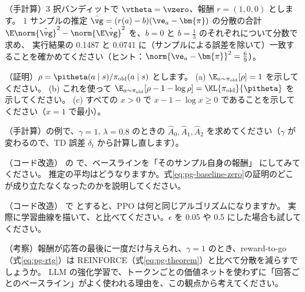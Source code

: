 \begin{exercises}
\item\label{ex:pg-bandit-var} （手計算）3 択バンディットで $\vtheta=\vzero$、報酬 $r=(1,0,0)$ とします。
1 サンプルの推定 $\hat{\vg}=(r(a)-b)(\ve_a-\bm{\pi})$ の分散の合計 $\E\norm{\hat{\vg}}^2-\norm{\E\hat{\vg}}^2$ を、$b=0$ と $b=\frac13$ のそれぞれについて分数で求め、
実行結果の 0.1487 と 0.0741 に（サンプルによる誤差を除いて）一致することを確かめてください（ヒント：$\norm{\ve_a-\bm{\pi}}^2=\frac69$）。
\item\label{ex:pg-kl-estimator} （証明）$\rho=\pitheta(a\mid s)/\pi_{\text{old}}(a\mid s)$ とします。
(a) $\E_{a\sim\pi_{\text{old}}}[\rho]=1$ を示してください。
(b) これを使って $\E_{a\sim\pi_{\text{old}}}[\rho-1-\log\rho]=\KL{\pi_{\text{old}}}{\pitheta}$ を示してください。
(c) すべての $x>0$ で $x-1-\log x\ge0$ であることを示してください（$x=1$ で最小）。
\item （手計算）の例で、$\gamma=1$, $\lambda=0.8$ のときの $\hat{A}_0,\hat{A}_1,\hat{A}_2$ を求めてください（$\gamma$ が変わるので、TD 誤差 $\delta_t$ から計算し直します）。
\item\label{ex:pg-self-baseline} （コード改造） の  で、ベースラインを「そのサンプル自身の報酬」 にしてみてください。
推定の平均はどうなりますか。式\eqref{eq:pg-baseline-zero}の証明のどこが成り立たなくなったのかを説明してください。
\item （コード改造） で  とすると、PPO は何と同じアルゴリズムになりますか。
実際に学習曲線を描いて、と比べてください。$\epsilon$ を 0.05 や 0.5 にした場合も試してください。
\item （考察）報酬が応答の最後に一度だけ与えられ、$\gamma=1$ のとき、reward-to-go（式\eqref{eq:pg-rtg}）は REINFORCE（式\eqref{eq:pg-theorem}）と比べて分散を減らすでしょうか。
LLM の強化学習で、トークンごとの価値ネットを使わずに「回答ごとのベースライン」がよく使われる理由を、この観点から考えてください。
\end{exercises}
